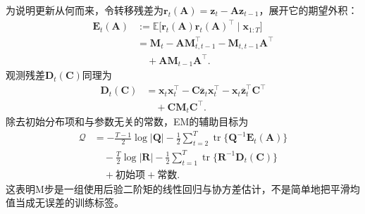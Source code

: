 为说明更新从何而来，令转移残差为$\bm r_t(\bm A)=\bm z_t-\bm A\bm z_{t-1}$，展开它的期望外积：
\begin{equation}
  \begin{aligned}
    \bm{E}_t(\bm{A})
      &:=\mathbb{E}\bigl[
        \bm r_t(\bm A)\bm r_t(\bm A)^\top
        \mid\bm{x}_{1:T}\bigr]\\
      &=\bm{M}_t-\bm{A}\bm{M}_{t,t-1}^{\top}
        -\bm{M}_{t,t-1}\bm{A}^{\top}\\
      &\quad{}+\bm{A}\bm{M}_{t-1}\bm{A}^{\top}.
  \end{aligned}
  \label{eq:pgm-dynamic-transition-residual}
\end{equation}
观测残差$\bm{D}_t(\bm{C})$同理为
\[
  \begin{aligned}
    \bm{D}_t(\bm{C})
      &=\bm{x}_t\bm{x}_t^\top
        -\bm{C}\overline{\bm{z}}_t\bm{x}_t^\top
        -\bm{x}_t\overline{\bm{z}}_t^\top\bm{C}^\top\\
      &\quad{}+\bm{C}\bm{M}_t\bm{C}^\top.
  \end{aligned}
\]
除去初始分布项和与参数无关的常数，EM的辅助目标为
\begin{equation}
  \begin{aligned}
    \mathcal Q
      &=-\frac{T-1}{2}\log|\bm Q|
        -\frac12\sum_{t=2}^{T}
          \operatorname{tr}\{\bm Q^{-1}\bm E_t(\bm A)\}\\
      &\quad{}-\frac{T}{2}\log|\bm R|
        -\frac12\sum_{t=1}^{T}
          \operatorname{tr}\{\bm R^{-1}\bm D_t(\bm C)\}\\
      &\quad{}+\text{初始项}+\text{常数}.
  \end{aligned}
  \label{eq:pgm-dynamic-lgssm-q}
\end{equation}
这表明M步是一组使用后验二阶矩的线性回归与协方差估计，不是简单地把平滑均值当成无误差的训练标签。

